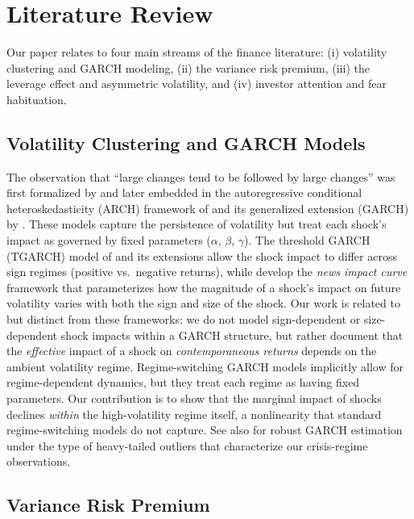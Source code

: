 \documentclass[12pt,a4paper]{article}
\begin{document}
\section{Literature Review}
\label{sec:lit}

Our paper relates to four main streams of the finance literature: (i) volatility clustering and GARCH modeling, (ii) the variance risk premium, (iii) the leverage effect and asymmetric volatility, and (iv) investor attention and fear habituation.

\subsection{Volatility Clustering and GARCH Models}

The observation that ``large changes tend to be followed by large changes'' was first formalized by \citet{mandelbrot1963} and later embedded in the autoregressive conditional heteroskedasticity (ARCH) framework of \citet{engle1982} and its generalized extension (GARCH) by \citet{bollerslev1986}. These models capture the persistence of volatility but treat each shock's impact as governed by fixed parameters ($\alpha$, $\beta$, $\gamma$). The threshold GARCH (TGARCH) model of \citet{zakoian1994} and its extensions allow the shock impact to differ across sign regimes (positive vs.\ negative returns), while \citet{engle1993} develop the \textit{news impact curve} framework that parameterizes how the magnitude of a shock's impact on future volatility varies with both the sign and size of the shock. Our work is related to but distinct from these frameworks: we do not model sign-dependent or size-dependent shock impacts within a GARCH structure, but rather document that the \textit{effective} impact of a shock on \textit{contemporaneous returns} depends on the ambient volatility regime. Regime-switching GARCH models \citep{hamilton1989, haas2004} implicitly allow for regime-dependent dynamics, but they treat each regime as having fixed parameters. Our contribution is to show that the marginal impact of shocks declines \textit{within} the high-volatility regime itself, a nonlinearity that standard regime-switching models do not capture. See also \citet{muler2008} for robust GARCH estimation under the type of heavy-tailed outliers that characterize our crisis-regime observations.

\subsection{Variance Risk Premium}
\end{document}
